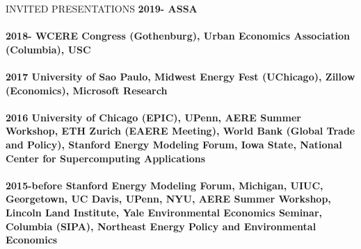 \documentclass{resume} %
\begin{document}
\begin{rSection}{INVITED PRESENTATIONS}
\bf{2019- ASSA} \\
\\
\bf{2018- WCERE Congress (Gothenburg), Urban Economics Association (Columbia), USC} \\
\\
\bf 2017  University of Sao Paulo, Midwest Energy Fest (UChicago), Zillow (Economics), Microsoft Research   \\
\\
\bf 2016 University of Chicago (EPIC), UPenn, AERE Summer Workshop, ETH Zurich (EAERE
Meeting), World Bank (Global Trade and Policy), Stanford Energy Modeling Forum, Iowa State,
National Center for Supercomputing Applications  \\
\\
\bf 2015-before Stanford Energy Modeling Forum, Michigan, UIUC, Georgetown, UC Davis,
UPenn, NYU, AERE Summer Workshop, Lincoln Land Institute, Yale Environmental Economics Seminar, Columbia
(SIPA), Northeast Energy Policy and Environmental Economics \\

\end{rSection}
















\end{document}
